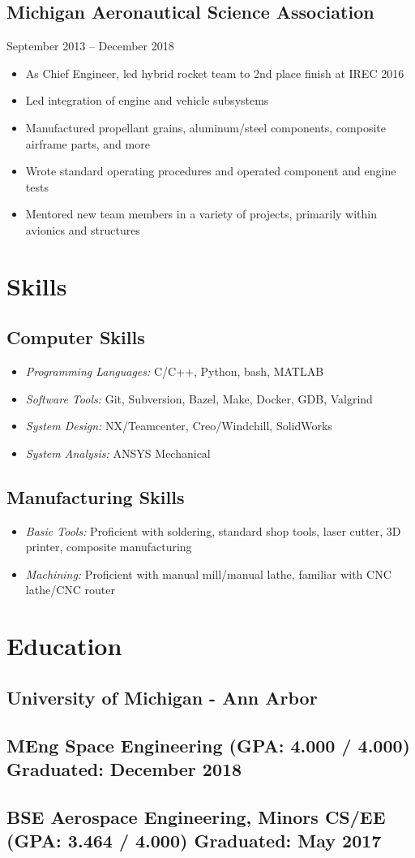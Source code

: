 \documentclass{article}
\begin{document}
\subsection{\textbf{Michigan Aeronautical Science Association}}{September 2013 -- December 2018}
\begin{itemize}
    \item As Chief Engineer, led hybrid rocket team to 2nd place finish at IREC 2016
    \item Led integration of engine and vehicle subsystems
    \item Manufactured propellant grains, aluminum/steel components, composite airframe parts, and more
    \item Wrote standard operating procedures and operated component and engine tests
    \item Mentored new team members in a variety of projects, primarily within avionics and structures
\end{itemize}

\section{Skills}

\subsection{Computer Skills}
\begin{itemize}
    \item \textit{Programming Languages:} C/C++, Python, bash, MATLAB
    \item \textit{Software Tools:} Git, Subversion, Bazel, Make, Docker, GDB, Valgrind
    \item \textit{System Design:} NX/Teamcenter, Creo/Windchill, SolidWorks
    \item \textit{System Analysis:} ANSYS Mechanical
\end{itemize}

\subsection{Manufacturing Skills}
\begin{itemize}
    \item \textit{Basic Tools:} Proficient with soldering, standard shop tools, laser cutter, 3D printer, composite manufacturing
    \item \textit{Machining:} Proficient with manual mill/manual lathe, familiar with CNC lathe/CNC router
\end{itemize}

\section{Education}
\subsection{\textbf{University of Michigan - Ann Arbor}}
\subsection{MEng Space Engineering (GPA: 4.000 / 4.000) \hfill Graduated: December 2018}
\subsection{BSE Aerospace Engineering, Minors CS/EE (GPA: 3.464 / 4.000) \hfill Graduated: May 2017}
\end{document}
